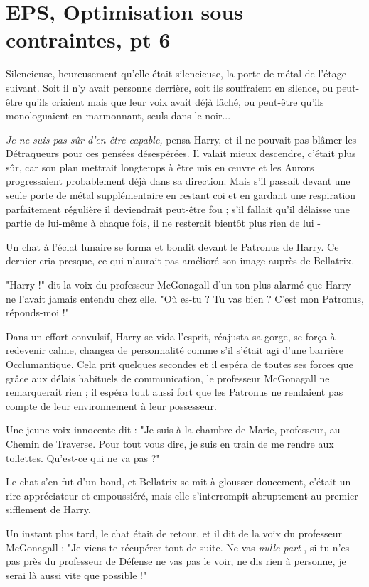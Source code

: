 
\chapter{EPS, Optimisation sous contraintes, pt 6}

Silencieuse, heureusement qu'elle était silencieuse, la porte de métal de l'étage suivant. Soit il n'y avait personne derrière, soit ils souffraient en silence, ou peut-être qu'ils criaient mais que leur voix avait déjà lâché, ou peut-être qu'ils monologuaient en marmonnant, seuls dans le noir...

\emph{Je ne suis pas sûr d'en être capable,}  pensa Harry, et il ne pouvait pas blâmer les Détraqueurs pour ces pensées désespérées. Il valait mieux descendre, c'était plus sûr, car son plan mettrait longtemps à être mis en œuvre et les Aurors progressaient probablement déjà dans sa direction. Mais s'il passait devant une seule porte de métal supplémentaire en restant coi et en gardant une respiration parfaitement régulière il deviendrait peut-être fou ; s'il fallait qu'il délaisse une partie de lui-même à chaque fois, il ne resterait bientôt plus rien de lui -

Un chat à l'éclat lunaire se forma et bondit devant le Patronus de Harry. Ce dernier cria presque, ce qui n'aurait pas amélioré son image auprès de Bellatrix.

"Harry !" dit la voix du professeur McGonagall d'un ton plus alarmé que Harry ne l'avait jamais entendu chez elle. "Où es-tu ? Tu vas bien ? C'est mon Patronus, réponds-moi !"

Dans un effort convulsif, Harry se vida l'esprit, réajusta sa gorge, se força à redevenir calme, changea de personnalité comme s'il s'était agi d'une barrière Occlumantique. Cela prit quelques secondes et il espéra de toutes ses forces que grâce aux délais habituels de communication, le professeur McGonagall ne remarquerait rien ; il espéra tout aussi fort que les Patronus ne rendaient pas compte de leur environnement à leur possesseur.

Une jeune voix innocente dit : "Je suis à la chambre de Marie, professeur, au Chemin de Traverse. Pour tout vous dire, je suis en train de me rendre aux toilettes. Qu'est-ce qui ne va pas ?"

Le chat s'en fut d'un bond, et Bellatrix se mit à glousser doucement, c'était un rire appréciateur et empoussiéré, mais elle s'interrompit abruptement au premier sifflement de Harry.

Un instant plus tard, le chat était de retour, et il dit de la voix du professeur McGonagall : "Je viens te récupérer tout de suite. Ne vas \emph{nulle part} , si tu n'es pas près du professeur de Défense ne vas pas le voir, ne dis rien à personne, je serai là aussi vite que possible !"

